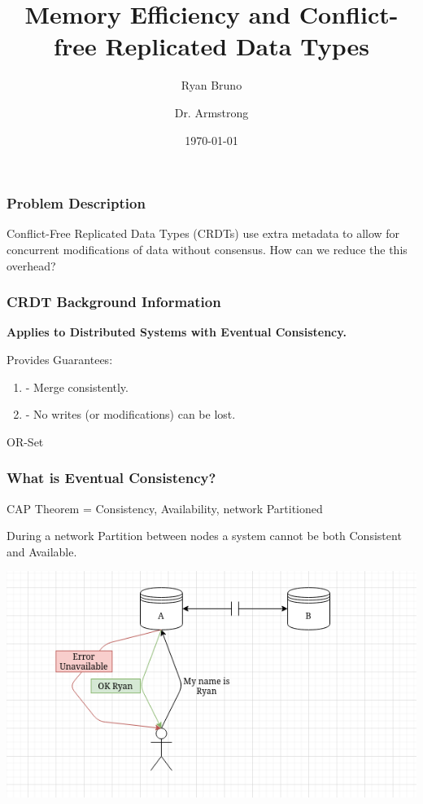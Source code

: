 \documentclass{beamer}
\title{Memory Efficiency and Conflict-free Replicated Data Types}
\author{Ryan Bruno \and Dr. Armstrong}
\date{\today}
\begin{document}
    \begin{frame}
        \titlepage
    \end{frame}
    \begin{frame}[shrink]
        \frametitle{Problem Description}
        \begin{center}
        \begin{minipage}{4in}
          Conflict-Free Replicated Data Types (CRDTs) use extra metadata
          to allow for concurrent modifications of data without
          consensus. How can we reduce the this overhead?
        \end{minipage}
        \end{center}
    \end{frame}
    \begin{frame}[shrink]
        \frametitle{CRDT Background Information}

        \textbf{Applies to Distributed Systems with Eventual Consistency.}

        Provides Guarantees:

        \begin{enumerate}
        \item - Merge consistently.
        \item - No writes (or modifications) can be lost.
        \end{enumerate}

        OR-Set

    \end{frame}
    \begin{frame}
        \frametitle{What is Eventual Consistency?}

        CAP Theorem = Consistency, Availability, network Partitioned

        \begin{center}
        \begin{minipage}{4in}
         During a network Partition between nodes a system cannot be
         both {\color{red}Consistent} and {\color{green}Available}.
        \end{minipage}
        \end{center}
        \begin{center}
        \includegraphics[width=.75\textwidth]{CapDiagram}
        \end{center}
    \end{frame}
\end{document}

